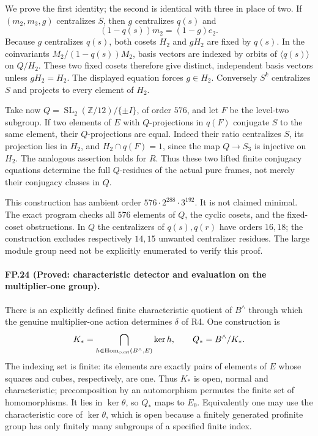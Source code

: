 We prove the first identity; the second is identical with three in place
of two. If $(m_2,m_3,g)$ centralizes $S$, then $g$ centralizes $q(s)$ and
\[
 (1-q(s))m_2=(1-g)e_2.
\]
Because $g$ centralizes $q(s)$, both cosets $H_2$ and $gH_2$ are fixed by
$q(s)$. In the coinvariants $M_2/(1-q(s))M_2$, basis vectors are indexed
by orbits of $\langle q(s)\rangle$ on $Q/H_2$. These two fixed cosets
therefore give distinct, independent basis vectors unless $gH_2=H_2$.
The displayed equation forces $g\in H_2$. Conversely $S^k$ centralizes
$S$ and projects to every element of $H_2$.

Take now $Q=\operatorname{SL}_2(\mathbb Z/12)/\{\pm I\}$, of order
$576$, and let $F$ be the level-two subgroup. If two elements of $E$ with
$Q$-projections in $q(F)$ conjugate $S$ to the same element, their
$Q$-projections are equal. Indeed their ratio centralizes $S$, its
projection lies in $H_2$, and
$H_2\cap q(F)=1$, since the map $Q\to S_3$ is injective on $H_2$.
The analogous assertion holds for $R$. Thus these two lifted finite
conjugacy equations determine the full $Q$-residues of the actual pure
frames, not merely their conjugacy classes in $Q$.

This construction has ambient order
$576\cdot2^{288}\cdot3^{192}$. It is not claimed minimal.
The exact program checks all $576$ elements of $Q$, the cyclic cosets,
and the fixed-coset obstructions. In $Q$ the centralizers of $q(s),q(r)$
have orders $16,18$; the construction excludes respectively $14,15$
unwanted centralizer residues. The large module group need not be
explicitly enumerated to verify this proof.

\paragraph{FP.24 (Proved: characteristic detector and evaluation on the multiplier-one group).}
There is an explicitly defined finite characteristic quotient of
$B^\wedge$ through which the genuine multiplier-one action determines
$\delta$ of R4. One construction is
\[
 K_* =\bigcap_{h\in\operatorname{Hom}_{\rm cont}(B^\wedge,E)}\ker h,
 \qquad Q_*=B^\wedge/K_*.
\]
The indexing set is finite: its elements are exactly pairs of elements
of $E$ whose squares and cubes, respectively, are one. Thus $K_*$ is
open, normal and characteristic; precomposition by an automorphism
permutes the finite set of homomorphisms. It lies in $\ker\theta$,
so $Q_*$ maps to $E_0$. Equivalently one may use the characteristic core
of $\ker\theta$, which is open because a finitely generated profinite
group has only finitely many subgroups of a specified finite index.

